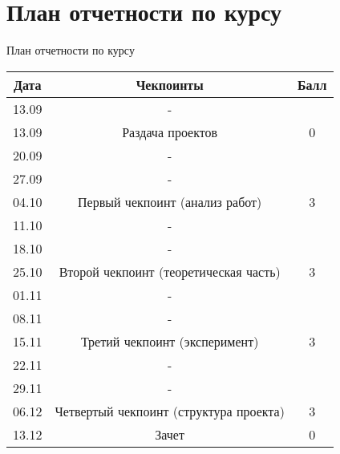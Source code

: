 \documentclass[10pt,pdf,hyperref={unicode}]{beamer}
\begin{document}
\section{План отчетности по курсу}
\begin{frame}{План отчетности по курсу}
\bigskip
\begin{table}[]
\begin{tabular}{|c|c|c|}
\hline
Дата  & Чекпоинты                              & Балл \\ \hline
13.09 & -                                      &      \\ \hline
13.09 & Раздача проектов                       & 0    \\ \hline
20.09 & -                                      &      \\ \hline
27.09 & -                                      &      \\ \hline
04.10 & Первый чекпоинт (анализ работ)         & 3    \\ \hline
11.10 & -                                      &      \\ \hline
18.10 & -                                      &      \\ \hline
25.10 & Второй чекпоинт (теоретическая часть)  & 3    \\ \hline
01.11 & -                                      &      \\ \hline
08.11 & -                                      &      \\ \hline
15.11 & Третий чекпоинт (эксперимент)          & 3    \\ \hline
22.11 & -                                      &      \\ \hline
29.11 & -                                      &      \\ \hline
06.12 & Четвертый чекпоинт (структура проекта) & 3    \\ \hline
13.12 & Зачет                                  & 0    \\ \hline
\end{tabular}
\end{table}
\end{frame}

\end{document}
